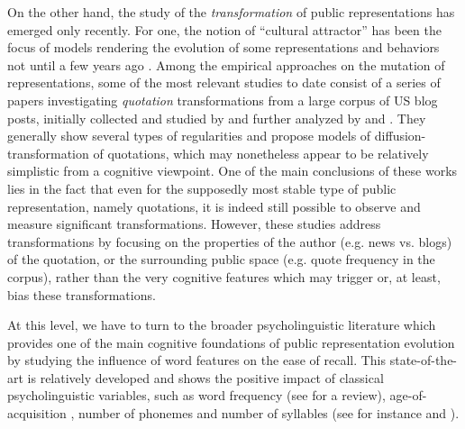 On the other hand, the study of the \emph{transformation} of public representations has emerged only recently. For one, the notion of ``cultural attractor'' has been the focus of models rendering the evolution of some representations and behaviors not until a few years ago \citep{Claidiere07}. Among the empirical approaches on the mutation of representations, some of the most relevant studies to date consist of a series of papers investigating \emph{quotation} transformations from a large corpus of US blog posts, initially collected and studied by \citet{Leskovec09} and further analyzed by \citet{Simmons11} and \citet{omod-mult}. They generally show several types of regularities and propose models of diffusion-transformation of quotations, which may nonetheless appear to be relatively simplistic from a cognitive viewpoint.  One of the main conclusions of these works lies in the fact that even for the supposedly most stable type of public representation, namely quotations, it is indeed still possible to observe and measure significant transformations.  However, these studies address transformations by focusing on the properties of the author (e.g. news vs. blogs) of the quotation, or the surrounding public space (e.g. quote frequency in the corpus), rather than the very cognitive features which may trigger or, at least, bias these transformations. %

At this level, we have to turn to the broader psycholinguistic literature which provides one of the main cognitive foundations of public representation evolution by studying the influence of word features on the ease of recall. This state-of-the-art is relatively developed and shows the positive impact of classical psycholinguistic variables, such as word frequency (see \citet{Yonelinas02} for a review), age-of-acquisition \citep{Zevin02}, number of phonemes and number of syllables (see for instance \citet{Rey98} and \citet{nick-diss}).

